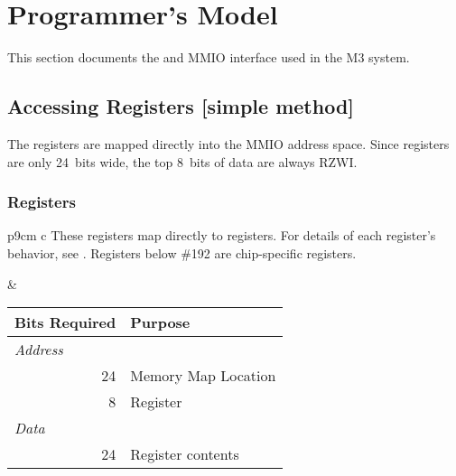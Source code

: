 \section{\proto Programmer's Model}
\label{sec:programmer}

This section documents the \bus and \proto MMIO interface used in the M3
system.

\subsection{Accessing \proto Registers [simple method]}
\label{prog:proto-registers-simple}

The \proto registers are mapped directly into the MMIO address space. Since
\proto registers are only 24~bits wide, the top 8~bits of data are always
RZWI.

\subsubsection{\proto Registers}
\label{prog:mmap:proto-registers-simple}
\begin{tabular}{p{9cm} c}
\vspace{-4em}
These registers map directly to \proto registers. For details of each
register's behavior, see . Registers below \#192 are
chip-specific registers.

&

\begin{tabular}{r l}
  Bits Required & Purpose \\
  \hline
  \hline
  \multicolumn{1}{l}{\em Address} & \\
  24 & Memory Map Location \\
   8 & \proto Register \\
  \multicolumn{1}{l}{\em Data} & \\
  24 & Register contents \\
\end{tabular}

\\
\end{tabular}

